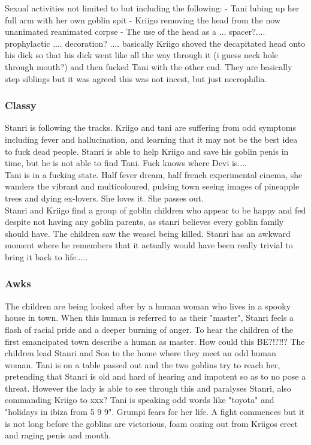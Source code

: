 Sexual activities not limited to but including the following: - Tani lubing up her full arm with her own goblin spit - Kriigo removing the head from the now unanimated reanimated corpse - The use of the head as a ... spacer?.... prophylactic .... decoration? .... basically Kriigo shoved the decapitated head onto his dick so that his dick went like all the way through it (i guess neck hole through mouth?) and then fucked Tani with the other end. They are basically step siblings but it was agreed this was not incest, but just necrophilia.\\

\subsubsection{Classy}
Stanri is following the tracks. Kriigo and tani are suffering from odd symptoms including fever and hallucination, and learning that it may not be the best idea to fuck dead people. Stanri is able to help Kriigo and save his goblin penis in time, but he is not able to find Tani. Fuck knows where Devi is....\\

Tani is in a fucking state. Half fever dream, half french experimental cinema, she wanders the vibrant and multicoloured, pulsing town seeing images of pineapple trees and dying ex-lovers. She loves it. She passes out.\\

Stanri and Kriigo find a group of goblin children who appear to be happy and fed despite not having any goblin parents, as stanri believes every goblin family should have. The children saw the weasel being killed. Stanri has an awkward moment where he remembers that it actually would have been really trivial to bring it back to life.....\\

\subsubsection{Awks}
The children are being looked after by a human woman who lives in a spooky house in town. When this human is referred to as their "master", Stanri feels a flash of racial pride and a deeper burning of anger. To hear the children of the first emancipated town describe a human as master. How could this BE?!?!!? The children lead Stanri and Son to the home where they meet an odd human woman. Tani is on a table passed out and the two goblins try to reach her, pretending that Stanri is old and hard of hearing and impotent so as to no pose a threat. However the lady is able to see through this and paralyses Stanri, also commanding Kriigo to xxx? Tani is speaking odd words like "toyota" and "holidays in ibiza from 5 9 9". Grumpi fears for her life. A fight commences but it is not long before the goblins are victorious, foam oozing out from Kriigos erect and raging penis and mouth.\\

